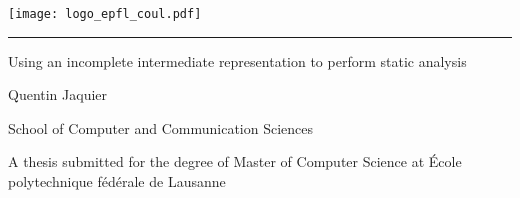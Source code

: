 
%        




\newcommand{\logoepfl}[0]{
  \begin{center}
    \texttt{[image: logo\_epfl\_coul.pdf]}
  \end{center}
  \vspace{0.3cm}
  \hrule
}
\newcommand{\logolasec}[0]{
  \vspace{1cm}
  \hrule
  \begin{center}
    \texttt{[image: logo\_lasec\_coul.eps]}
  \end{center}
}
\newcommand{\project}[1]{
  \begin{center}
    \large{#1}
  \end{center}
  \vspace{1cm}
}
\newcommand{\department}[1]{
  \begin{center}
    \large{#1}
  \end{center}
}
\newcommand{\supervisor}[3]{
  \begin{center}
    \begin{normalsize}{
        \bf #1}\\#2\\#3
    \end{normalsize}
  \end{center}
}
\renewcommand{\author}[1]{
  \begin{center}
    \Large{#1}
  \end{center}
  \vspace{0.5cm}
}
\renewcommand{\title}[1]{
  \vspace{3cm}
  \begin{center}
    \huge{#1}
  \end{center}
  \vspace{1.7cm}
}
\renewcommand{\date}[2]{
  \begin{center}
    \normalsize{#1 #2}
  \end{center}
  \vspace{0.5cm}
}


\thispagestyle{empty}


  \logoepfl

  \title{Using an incomplete intermediate representation to perform static analysis}

  \author{Quentin Jaquier}
  \department{School of Computer and Communication Sciences}
  \project{A thesis submitted for the degree of Master of Computer Science at École polytechnique fédérale de Lausanne}

